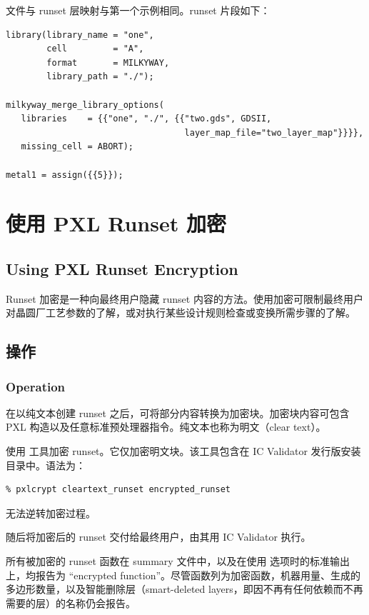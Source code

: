  文件与 runset 层映射与第一个示例相同。runset 片段如下：
\begin{lstlisting}[style=pxl]
library(library_name = "one",
        cell         = "A",
        format       = MILKYWAY,
        library_path = "./");

milkyway_merge_library_options(
   libraries    = {{"one", "./", {{"two.gds", GDSII,
                                   layer_map_file="two_layer_map"}}}},
   missing_cell = ABORT);

metal1 = assign({{5}});
\end{lstlisting}

\section{使用 PXL Runset 加密}
\subsection*{Using PXL Runset Encryption}

Runset 加密是一种向最终用户隐藏 runset 内容的方法。使用加密可限制最终用户对晶圆厂工艺参数的了解，或对执行某些设计规则检查或变换所需步骤的了解。

\subsection{操作}
\subsubsection*{Operation}

在以纯文本创建 runset 之后，可将部分内容转换为加密块。加密块内容可包含 PXL 构造以及任意标准预处理器指令。纯文本也称为明文（clear text）。

使用  工具加密 runset。它仅加密明文块。该工具包含在 IC Validator 发行版安装目录中。语法为：
\begin{lstlisting}
% pxlcrypt cleartext_runset encrypted_runset
\end{lstlisting}

 无法逆转加密过程。

随后将加密后的 runset 交付给最终用户，由其用 IC Validator 执行。

所有被加密的 runset 函数在 summary 文件中，以及在使用  选项时的标准输出上，均报告为 ``encrypted function''。尽管函数列为加密函数，机器用量、生成的多边形数量，以及智能删除层（smart-deleted layers，即因不再有任何依赖而不再需要的层）的名称仍会报告。

